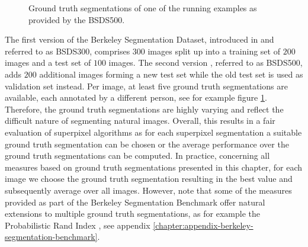 \begin{figure}[b]
{	}
	\caption[Several ground truth segmentations of one of the running examples as provided by the Berkeley Segmentation Dataset \cite{ArbelaezMaireFowlkesMalik:2011}.]{Ground truth segmentations of one of the running examples as provided by the BSDS500.}
	\label{fig:datasets-bsd-ground-truth}
\end{figure}
The first version of the Berkeley Segmentation Dataset, introduced in \cite{MartinFowlkesTalMalik:2001} and referred to as BSDS300, comprises $300$ images split up into a training set of $200$ images and a test set of $100$ images. The second version \cite{ArbelaezMaireFowlkesMalik:2011}, referred to as BSDS500, adds $200$ additional images forming a new test set while the old test set is used as validation set instead. Per image, at least five ground truth segmentations are available, each annotated by a different person, see for example figure \ref{fig:datasets-bsd-ground-truth}. Therefore, the ground truth segmentations are highly varying and reflect the difficult nature of segmenting natural images. Overall, this results in a fair evaluation of superpixel algorithms as for each superpixel segmentation a suitable ground truth segmentation can be chosen or the average performance over the ground truth segmentations can be computed. In practice, concerning all measures based on ground truth segmentations presented in this chapter, for each image we choose the ground truth segmentation resulting in the best value and subsequently average over all images. However, note that some of the measures provided as part of the Berkeley Segmentation Benchmark offer natural extensions to multiple ground truth segmentations, as for example the Probabilistic Rand Index \cite{UnnikrishnanPantofaruHebert:2007}, see appendix \ref{chapter:appendix-berkeley-segmentation-benchmark}.
